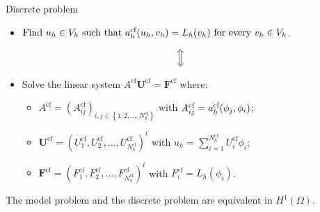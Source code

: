 \begin{frame}{Discrete problem}
	\begin{itemize}
		\item $\text{Find }u_h\in V_h\text{ such that }a_h^{\text{cf}}(u_h,v_h)=L_h(v_h)\text{ for every }v_h\in V_h$.
	\end{itemize}
	\vspace*{0.1cm}
	$$\Big{\Updownarrow}$$
	\vspace*{-0.3cm}
	\begin{itemize}
		\item Solve the linear system $A^{\text{cf}}\mathbf{U}^{\text{cf}}=\mathbf{F}^{\text{cf}}$ where:
		\vspace*{0.3cm}
		\begin{itemize}
			\item $A^{\text{cf}}=\left(A_{ij}^{\text{cf}}\right)_{i,j\in\left\{1,2,\ldots,N_h^{\text{cf}}\right\}}$ with $A_{ij}^{\text{cf}}=a_h^{\text{cf}}(\phi_j,\phi_i)$;
			\item $\mathbf{U}^{\text{cf}}=\left(U_1^{\text{cf}},U_2^{\text{cf}},\ldots,U_{N_h^{\text{cf}}}^{\text{cf}}\right)^t$ with $u_h=\displaystyle\sum_{i=1}^{N_h^{\text{cf}}}U_i^{\text{cf}}\phi_i$;
			\item $\mathbf{F}^{\text{cf}}=\left(F_1^{\text{cf}},F_2^{\text{cf}},\ldots,F_{N_h^{\text{cf}}}^{\text{cf}}\right)^t$ with $F_i^{\text{cf}}=L_h(\phi_i)$.
		\end{itemize}
	\end{itemize}
	
	\vspace*{0.3cm}
	The model problem and the discrete problem are \alert{equivalent} in $H^1(\Omega)$.
	
	\end{frame}
	
